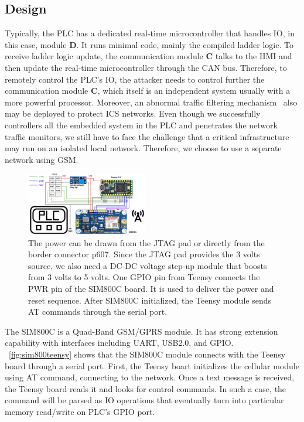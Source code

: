 \subsection{Design}

Typically, the PLC has a dedicated real-time microcontroller
that handles IO, in this case, module \textbf{D}. It runs minimal code, mainly the compiled ladder logic.  To receive ladder logic update, the communication module \textbf{C} talks to the HMI and then update the real-time microcontroller through the CAN bus. Therefore, to remotely control the PLC's IO, the attacker needs to control further the communication module \textbf{C}, which itself is an independent system usually with a more powerful processor. Moreover, an abnormal traffic filtering mechanism~\cite{kim2016abnormal} also may be deployed to protect ICS networks. Even though we successfully controllers all the embedded system in the PLC and penetrates the network traffic monitors, we still have to face the challenge that a critical infrastructure may run on an isolated local network. Therefore, we choose to use a separate network using GSM.

\begin{figure}[th]
	\includegraphics[width=0.47\textwidth]{figures/sim800teensy}
	\centering
	\caption{The power can be drawn from the JTAG pad or directly from the border connector p607. Since the JTAG pad provides the 3 volts source, we also need a DC-DC voltage step-up module that boosts from 3 volts to 5 volts. One GPIO pin from Teensy connects the PWR pin of the SIM800C board. It is used to deliver the power and reset sequence. After SIM800C initialized, the Teensy module sends AT commands through the serial port.}
	\label{fig:sim800teensy}
\end{figure}

The SIM800C is a Quad-Band GSM/GPRS module. It has strong extension capability with interfaces including UART, USB2.0, and GPIO. ~\autoref{fig:sim800teensy} shows that the SIM800C module connects with the Teensy board through a serial port. First, the Teensy boart initializes the cellular module using AT command, connecting to the network. Once a text message is received, the Teensy board reads it and looks for control commands. In such a case,  the command will be parsed as IO operations that eventually turn into particular memory read/write on PLC's GPIO port.
